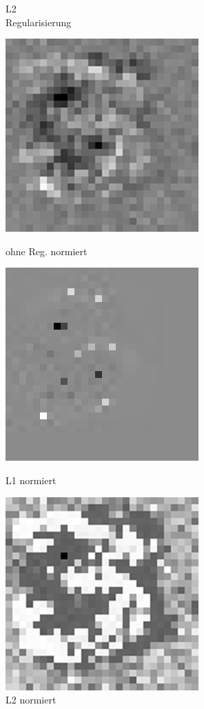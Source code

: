 \begin{figure}[ht]
\begin{minipage}[b]{.25\linewidth}
  		\caption{L2 \\ Regularisierung}
  	\end{minipage}
	\begin{minipage}[b]{.25\linewidth}
  		\includegraphics[scale=0.7]{bilder/l0_3_g}
  		\caption{ohne Reg. normiert}
  	\end{minipage}
  	\hspace{.05\linewidth}%
  	\begin{minipage}[b]{.25\linewidth}
  		\includegraphics[scale=0.7]{bilder/l1_3_g}
		\caption{L1 normiert}
	\end{minipage}
	\hspace{.05\linewidth}%
	\begin{minipage}[b]{.25\linewidth}
  		\includegraphics[scale=0.7]{bilder/l2_3_g}
  		\caption{L2 normiert}
  	\end{minipage}
\end{figure}
